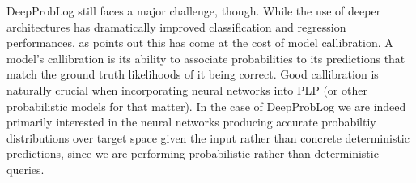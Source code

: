 DeepProbLog still faces a major challenge, though. While the use of deeper architectures has dramatically improved classification and regression performances, as \cite{guo2017calibration} points out this has come at the cost of model callibration. A model's callibration is its ability to associate probabilities to its predictions that match the ground truth likelihoods of it being correct. Good callibration is naturally crucial when incorporating neural networks into PLP (or other probabilistic models for that matter). In the case of DeepProbLog we are indeed primarily interested in the neural networks producing accurate probabiltiy distributions over target space given the input rather than concrete deterministic predictions, since we are performing probabilistic rather than deterministic queries. \par